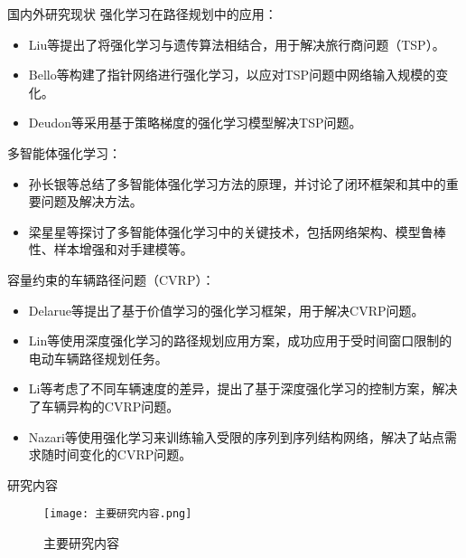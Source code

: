 \documentclass{ctexbeamer}
\begin{document}
\begin{frame}{国内外研究现状}
\scriptsize
 强化学习在路径规划中的应用：
    \begin{itemize}
        \item  Liu等提出了将强化学习与遗传算法相结合，用于解决旅行商问题（TSP）。
\item Bello等构建了指针网络进行强化学习，以应对TSP问题中网络输入规模的变化。
\item Deudon等采用基于策略梯度的强化学习模型解决TSP问题。
\end{itemize}
多智能体强化学习：
\begin{itemize}
 \item 孙长银等总结了多智能体强化学习方法的原理，并讨论了闭环框架和其中的重要问题及解决方法。
\item 梁星星等探讨了多智能体强化学习中的关键技术，包括网络架构、模型鲁棒性、样本增强和对手建模等。
\end{itemize}
容量约束的车辆路径问题（CVRP）：
\begin{itemize}
\item Delarue等提出了基于价值学习的强化学习框架，用于解决CVRP问题。
\item Lin等使用深度强化学习的路径规划应用方案，成功应用于受时间窗口限制的电动车辆路径规划任务。
\item Li等考虑了不同车辆速度的差异，提出了基于深度强化学习的控制方案，解决了车辆异构的CVRP问题。
\item Nazari等使用强化学习来训练输入受限的序列到序列结构网络，解决了站点需求随时间变化的CVRP问题。
    \end{itemize}

\end{frame}
\begin{frame}{研究内容}
    \begin{figure}[!h]
        \centering
        \texttt{[image: 主要研究内容.png]}
        \caption{主要研究内容}
        \label{fig:my_label}
    \end{figure}
\end{frame}
\end{document}
